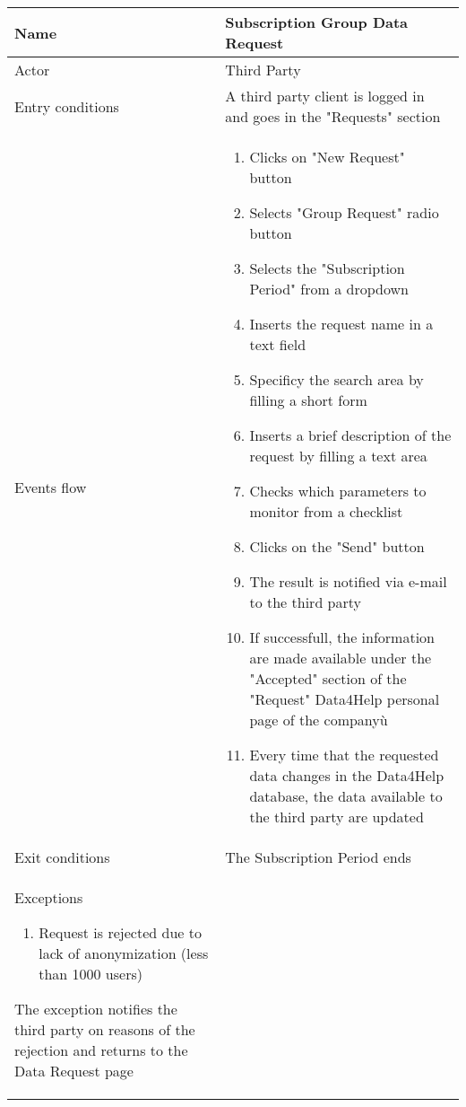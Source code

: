 \begin{table}[h!]
\begin{tabular}{|l|p{12cm}|}
\hline
Name             & Subscription Group Data Request \\ \hline
Actor            & Third Party \\ \hline
Entry conditions & A third party client is logged in and goes in the "Requests" section\\ \hline
Events flow      & \begin{enumerate}
\item Clicks on "New Request" button
\item Selects "Group Request" radio button
\item Selects the "Subscription Period" from a dropdown
\item Inserts the request name in a text field
\item Specificy the search area by filling a short form
\item Inserts a brief description of the request by filling a text area
\item Checks which parameters to monitor from a checklist
\item Clicks on the "Send" button
\item The result is notified via e-mail to the third party
\item If successfull, the information are made available under the "Accepted" section of the "Request" Data4Help personal page of the companyù
\item Every time that the requested data changes in the Data4Help database, the data available to the third party are updated
\end{enumerate} \\ \hline
Exit conditions  & The Subscription Period ends \\ \hline
Exceptions       
\begin{enumerate}
\item Request is rejected due to lack of anonymization (less than 1000 users)
\end{enumerate} The exception notifies the third party on reasons of the rejection and returns to the Data Request page\\ \hline
\end{tabular}
\end{table}

